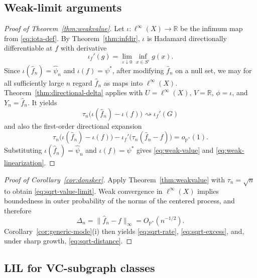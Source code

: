 \documentclass[11pt]{article}
\begin{document}
\subsection{Weak-limit arguments}
\begin{proof}[Proof of Theorem~\ref{thm:weakvalue}]
Let $\iota:\ell^{\infty}(X)\to\mathbb{R}$ be the infimum map from
\eqref{eq:iota-def}. By Theorem~\ref{thm:infdir}, $\iota$ is Hadamard
directionally differentiable at $f$ with derivative 
\[
\iota_{f}'(g)=\lim_{\varepsilon\downarrow0}\inf_{x\in S^{\varepsilon}}g(x).
\]
Since $\iota(\hat{f}_{n})=\hat{\psi}_{n}$ and $\iota(f)=\psi^{*}$,
after modifying $\hat{f}_{n}$ on a null set, we may for all sufficiently
large $n$ regard $\hat{f}_{n}$ as maps into $\ell^{\infty}(X)$. Theorem~\ref{thm:directional-delta} applies with
$U=\ell^{\infty}(X)$, $V=\mathbb{R}$, $\phi=\iota$, and $Y_{n}=\hat{f}_{n}$.
It yields 
\[
\tau_{n}\bigl(\iota(\hat{f}_{n})-\iota(f)\bigr)\rightsquigarrow\iota_{f}'(G)
\]
and also the first-order directional expansion
\[
\tau_{n}\bigl(\iota(\hat{f}_{n})-\iota(f)\bigr)-\iota_{f}'\bigl(\tau_{n}(\hat{f}_{n}-f)\bigr)=o_{\mathbb{P}^{*}}(1).
\]
Substituting $\iota(\hat{f}_{n})=\hat{\psi}_{n}$ and $\iota(f)=\psi^{*}$
gives \eqref{eq:weak-value} and \eqref{eq:weak-linearization}. 
\end{proof}
%
\begin{proof}[Proof of Corollary~\ref{cor:donsker}]
Apply Theorem~\ref{thm:weakvalue} with $\tau_{n}=\sqrt{n}$ to
obtain \eqref{eq:sqrt-value-limit}. Weak convergence in $\ell^{\infty}(X)$
implies boundedness in outer probability of the norms of the centered
process, and therefore 
\[
\Delta_{n}=\lVert\hat{f}_{n}-f\rVert_{\infty}=O_{\mathbb{P}^{*}}(n^{-1/2}).
\]
Corollary~\ref{cor:generic-mode}(i) then yields \eqref{eq:sqrt-rate},
\eqref{eq:sqrt-excess}, and, under sharp growth, \eqref{eq:sqrt-distance}. 
\end{proof}

\subsection{LIL for VC-subgraph classes}
\end{document}
